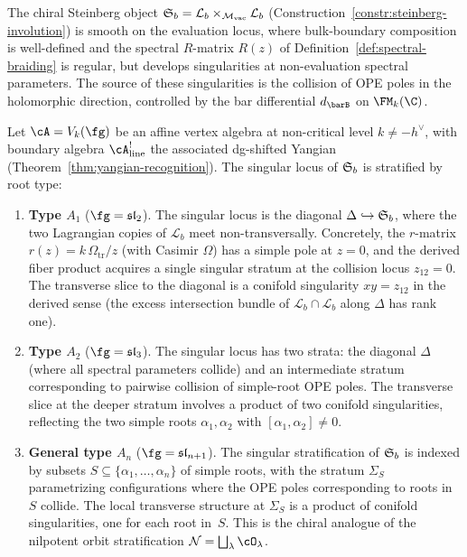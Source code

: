 The chiral Steinberg object
$\mathfrak{S}_b = \mathcal{L}_b \times_{{\mathcal{M}_{\mathrm{vac}}}} \mathcal{L}_b$
(Construction~\ref{constr:steinberg-involution}) is smooth on the
evaluation locus, where bulk-boundary composition is well-defined
and the spectral $R$-matrix $R(z)$ of
Definition~\ref{def:spectral-braiding} is regular, but develops
singularities at non-evaluation spectral parameters. The source
of these singularities is the collision of OPE poles in the
holomorphic direction, controlled by the bar differential $d_{\barB}$
on $\FM_k(\C)$.

\begin{conjecture}
\label{conj:singular-locus}
Let $\cA = V_k(\fg)$ be an affine vertex algebra at non-critical
level $k \neq -h^\vee$, with boundary algebra
$\cA^!_{\mathrm{line}}$ the associated dg-shifted Yangian
\textup{(}Theorem~\textup{\ref{thm:yangian-recognition})}.
The singular locus of $\mathfrak{S}_b$ is stratified by root type:
\begin{enumerate}[label=\textup{(\alph*)}]
\item \textbf{Type $A_1$} ($\fg = \fsl_2$).
 The singular locus is the diagonal
 $\Delta \hookrightarrow \mathfrak{S}_b$, where the two Lagrangian
 copies of $\mathcal{L}_b$ meet non-transversally. Concretely,
 the $r$-matrix $r(z) = k\,\Omega_{\mathrm{tr}}/z$ (with Casimir $\Omega$) has a
 simple pole at $z = 0$, and the derived fiber product acquires a
 single singular stratum at the collision locus $z_{12} = 0$.
 The transverse slice to the diagonal is a conifold singularity
 $xy = z_{12}$ in the derived sense (the excess intersection bundle
 of $\mathcal{L}_b \cap \mathcal{L}_b$ along $\Delta$ has rank one).

\item \textbf{Type $A_2$} ($\fg = \fsl_3$).
 The singular locus has two strata: the diagonal $\Delta$ (where all
 spectral parameters collide) and an intermediate stratum
 corresponding to pairwise collision of simple-root OPE poles.
 The transverse slice at the deeper stratum involves
 a product of two conifold singularities, reflecting the two simple
 roots $\alpha_1, \alpha_2$ with $[\alpha_1, \alpha_2] \neq 0$.

\item \textbf{General type $A_n$} ($\fg = \fsl_{n+1}$).
 The singular stratification of $\mathfrak{S}_b$ is indexed by
 subsets $S \subseteq \{\alpha_1, \ldots, \alpha_n\}$ of simple roots,
 with the stratum $\Sigma_S$ parametrizing configurations where the OPE
 poles corresponding to roots in $S$ collide. The local transverse
 structure at $\Sigma_S$ is a product of conifold singularities,
 one for each root in~$S$. This is the chiral analogue of the
 nilpotent orbit stratification $\cN = \bigsqcup_\lambda \cO_\lambda$.
\end{enumerate}
\end{conjecture}


